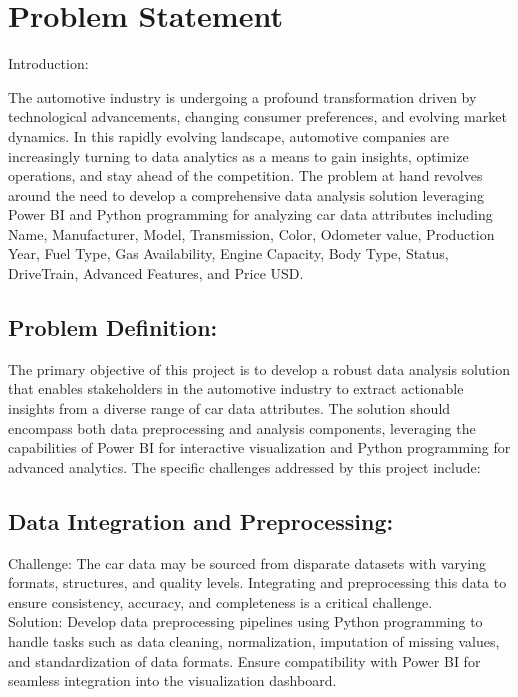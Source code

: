 \documentclass{article}
\begin{document}
\newpage
\section{Problem Statement}
\vspace{1cm}
{\fontsize{15}{15}\selectfont

Introduction:

The automotive industry is undergoing a profound transformation driven by technological advancements, changing consumer preferences, and evolving market dynamics. In this rapidly evolving landscape, automotive companies are increasingly turning to data analytics as a means to gain insights, optimize operations, and stay ahead of the competition. The problem at hand revolves around the need to develop a comprehensive data analysis solution leveraging Power BI and Python programming for analyzing car data attributes including Name, Manufacturer, Model, Transmission, Color, Odometer value, Production Year, Fuel Type, Gas Availability, Engine Capacity, Body Type, Status, DriveTrain, Advanced Features, and Price USD.

\subsection{Problem Definition:}

The primary objective of this project is to develop a robust data analysis solution that enables stakeholders in the automotive industry to extract actionable insights from a diverse range of car data attributes. The solution should encompass both data preprocessing and analysis components, leveraging the capabilities of Power BI for interactive visualization and Python programming for advanced analytics. The specific challenges addressed by this project include:

\subsection{Data Integration and Preprocessing:}

Challenge: The car data may be sourced from disparate datasets with varying formats, structures, and quality levels. Integrating and preprocessing this data to ensure consistency, accuracy, and completeness is a critical challenge.
\\
Solution: Develop data preprocessing pipelines using Python programming to handle tasks such as data cleaning, normalization, imputation of missing values, and standardization of data formats. Ensure compatibility with Power BI for seamless integration into the visualization dashboard.

}
\end{document}

